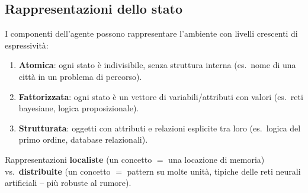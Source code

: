 \subsection{Rappresentazioni dello stato}
I componenti dell'agente possono rappresentare l'ambiente con livelli crescenti di espressività:
\begin{enumerate}
    \item \textbf{Atomica}: ogni stato è indivisibile, senza struttura interna (es.\ nome di una città in un problema di percorso).
    \item \textbf{Fattorizzata}: ogni stato è un vettore di variabili/attributi con valori (es.\ reti bayesiane, logica proposizionale).
    \item \textbf{Strutturata}: oggetti con attributi e relazioni esplicite tra loro (es.\ logica del primo ordine, database relazionali).
\end{enumerate}

Rappresentazioni \textbf{localiste} (un concetto $=$ una locazione di memoria) vs.\ \textbf{distribuite} (un concetto $=$ pattern su molte unità, tipiche delle reti neurali artificiali -- più robuste al rumore).